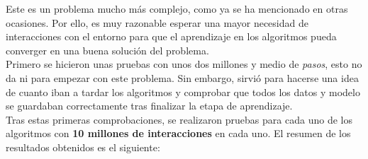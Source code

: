 \documentclass[11pt,fleqn]{book} %
\begin{document}
Este es un problema mucho más complejo, como ya se ha mencionado en otras ocasiones. Por ello, es muy razonable esperar una mayor necesidad de interacciones con el entorno para que el aprendizaje en los algoritmos pueda converger en una buena solución del problema. \\

Primero se hicieron unas pruebas con unos dos millones y medio de \textit{pasos}, esto no da ni para empezar con este problema. Sin embargo, sirvió para hacerse una idea de cuanto iban a tardar los algoritmos y comprobar que todos los datos y modelo se guardaban correctamente tras finalizar la etapa de aprendizaje. \\

Tras estas primeras comprobaciones, se realizaron pruebas para cada uno de los algoritmos con \textbf{10 millones de interacciones} en cada uno. El resumen de los resultados obtenidos es el siguiente:
\end{document}
